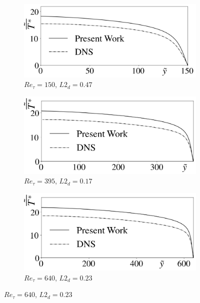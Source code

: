 \documentclass[10pt]{article} %
\begin{document}
\begin{figure}[!h]
	\centering
	\begin{subfigure}[t]{0.5\textwidth}
		\centering
		\includegraphics[angle=0, scale=0.24]{fotos_formatacao_final/Temperature_150_Avelocity}
		\caption{$Re_\tau = 150$, $L2_d = 0.47$}
	\end{subfigure}
	\begin{subfigure}[t]{0.45\textwidth}
		\centering
		\includegraphics[angle=0, scale=0.24]{fotos_formatacao_final/Temperature_395_Avelocity}
		\caption{$Re_\tau = 395$, $L2_d = 0.17$}
	\end{subfigure}
	\begin{subfigure}[t]{0.5\textwidth}
		\centering
		\includegraphics[angle=0, scale=0.24]{fotos_formatacao_final/Temperature_640_Avelocity}
		\caption{$Re_\tau = 640$, $L2_d = 0.23$}

\end{subfigure}
\end{figure}
\end{document}
